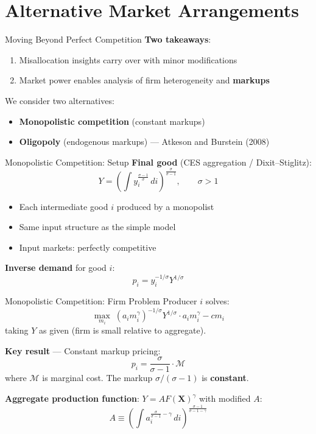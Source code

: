 \documentclass[blue]{beamer}
\begin{document}
\section{Alternative Market Arrangements}

\begin{frame}{Moving Beyond Perfect Competition}
	\textbf{Two takeaways}:
	\begin{enumerate}
		\item Misallocation insights carry over with minor modifications
		\item Market power enables analysis of firm heterogeneity and \textbf{markups}
	\end{enumerate}
	
	\bigskip
	We consider two alternatives:
	\begin{itemize}
		\item \textbf{Monopolistic competition} (constant markups)
		\item \textbf{Oligopoly} (endogenous markups) --- Atkeson and Burstein (2008)
	\end{itemize}
\end{frame}

\begin{frame}{Monopolistic Competition: Setup}
	\textbf{Final good} (CES aggregation / Dixit--Stiglitz):
	\[
	Y = \left( \int y_i^{\frac{\sigma-1}{\sigma}} \, di \right)^{\frac{\sigma}{\sigma-1}}, \qquad \sigma > 1
	\]
	
	\begin{itemize}
		\item Each intermediate good $i$ produced by a monopolist
		\item Same input structure as the simple model
		\item Input markets: perfectly competitive
	\end{itemize}
	
	\bigskip
	\textbf{Inverse demand} for good $i$:
	\[
	p_i = y_i^{-1/\sigma} Y^{1/\sigma}
	\]
\end{frame}

\begin{frame}{Monopolistic Competition: Firm Problem}
	Producer $i$ solves:
	\[
	\max_{m_i} \; (a_i m_i^\gamma)^{-1/\sigma} Y^{1/\sigma} \cdot a_i m_i^\gamma - c m_i
	\]
	taking $Y$ as given (firm is small relative to aggregate).
	
	\bigskip
	\textbf{Key result} --- Constant markup pricing:
	\[
	{p_i = \frac{\sigma}{\sigma - 1} \cdot \mathcal{M}}
	\]
	where $\mathcal{M}$ is marginal cost. The markup $\sigma/(\sigma-1)$ is \textbf{constant}.
	
	\bigskip
	\textbf{Aggregate production function}: $Y = A F(\mathbf{X})^\gamma$ with modified $A$:
	\[
	A \equiv \left( \int a_i^{\frac{\sigma}{\sigma-1} - \gamma} \, di \right)^{\frac{\sigma-1}{\sigma-1-\gamma}}
	\]
\end{frame}
\end{document}
